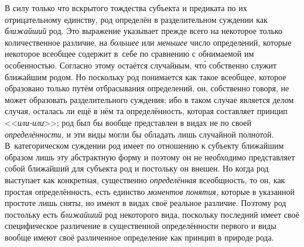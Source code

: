 В силу только что вскрытого тождества субъекта и предиката по
их отрицательному единству, род определён в разделительном суждении как
{\em ближайший} род. Это
выражение указывает прежде всего на некоторое только количественное
различие, на {\em большее} или {\em меньшее}
число определений, которые некоторое всеобщее содержит в~себе
по сравнению с обнимаемой им особенностью. Согласно этому остаётся
случайным, чт\'{о} собственно служит ближайшим родом. Но поскольку род
понимается как такое всеобщее, которое образовано только путём отбрасывания
определений, он, собственно говоря, не может образовать разделительного
суждения; ибо в таком случае является делом случая, осталась ли ещё в нём
та определённость, которая составляет принцип <<{\em или-или}>>; род был
бы вообще представлен в видах не по своей {\em определённости,} и
эти виды могли бы обладать лишь случайной полнотой. В~категорическом
суждении род имеет по отношению к субъекту ближайшим образом лишь эту
абстрактную форму и поэтому он не необходимо представляет собой ближайший
для субъекта род и постольку он внешен. Но когда род выступает как
конкретная, существенно {\em определённая}
всеобщность, то он, как простая определённость, есть единство
{\em моментов понятия,}
которые в указанной простоте лишь сняты, но
имеют в видах своё реальное различие. Поэтому род постольку есть
{\em ближайший} род
некоторого вида, поскольку последний имеет своё специфическое различение в
существенной определённости первого и виды вообще имеют своё различенное
определение как принцип в природе рода.

